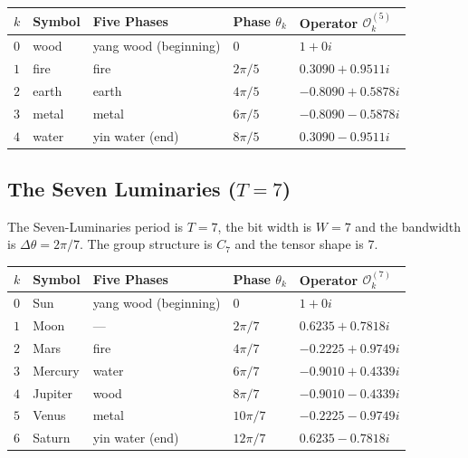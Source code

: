 \begin{center}
\begin{tabular}{>{\centering\arraybackslash}p{0.8cm}>{\centering\arraybackslash}p{2cm}>{\centering\arraybackslash}p{2.2cm}>{\centering\arraybackslash}p{2.5cm}>{\centering\arraybackslash}p{4cm}}
\toprule
$k$ & Symbol & Five Phases & Phase $\theta_k$ & Operator $\mathcal{O}_k^{(5)}$ \\
\midrule
$0$ & wood & yang wood (beginning) & $0$ & $1+0i$ \\
$1$ & fire & fire & $2\pi/5$ & $0.3090+0.9511i$ \\
$2$ & earth & earth & $4\pi/5$ & $-0.8090+0.5878i$ \\
$3$ & metal & metal & $6\pi/5$ & $-0.8090-0.5878i$ \\
$4$ & water & yin water (end) & $8\pi/5$ & $0.3090-0.9511i$ \\
\bottomrule
\end{tabular}
\end{center}

\subsection{\texorpdfstring{The Seven Luminaries ($T=7$)}{The Seven Luminaries (T=7)}}

\begin{definition}\label{def:qizheng_operators}
The Seven-Luminaries period is $T=7$, the bit width is $W=7$ and the bandwidth is $\Delta\theta=2\pi/7$. The group structure is $C_7$ and the tensor shape is $7$.
\end{definition}

\begin{center}
\begin{tabular}{>{\centering\arraybackslash}p{0.8cm}>{\centering\arraybackslash}p{2cm}>{\centering\arraybackslash}p{2.2cm}>{\centering\arraybackslash}p{2.5cm}>{\centering\arraybackslash}p{4cm}}
\toprule
$k$ & Symbol & Five Phases & Phase $\theta_k$ & Operator $\mathcal{O}_k^{(7)}$ \\
\midrule
$0$ & Sun & yang wood (beginning) & $0$ & $1+0i$ \\
$1$ & Moon & --- & $2\pi/7$ & $0.6235+0.7818i$ \\
$2$ & Mars & fire & $4\pi/7$ & $-0.2225+0.9749i$ \\
$3$ & Mercury & water & $6\pi/7$ & $-0.9010+0.4339i$ \\
$4$ & Jupiter & wood & $8\pi/7$ & $-0.9010-0.4339i$ \\
$5$ & Venus & metal & $10\pi/7$ & $-0.2225-0.9749i$ \\
$6$ & Saturn & yin water (end) & $12\pi/7$ & $0.6235-0.7818i$ \\
\bottomrule
\end{tabular}
\end{center}

